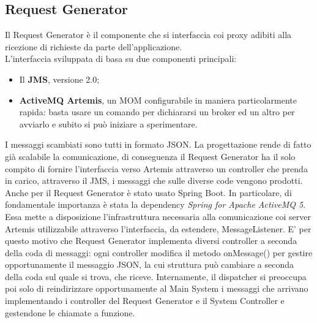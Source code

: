 \subsection{Request Generator}
Il Request Generator è il componente che si interfaccia coi proxy adibiti alla ricezione di richieste da parte dell'applicazione. 
\\L'interfaccia sviluppata di basa su due componenti principali: 
\begin{itemize}
	\item Il \textbf{JMS}, versione 2.0;
	\item \textbf{ActiveMQ Artemis}, un MOM configurabile in maniera particolarmente rapida: basta usare un comando per dichiararsi un broker ed un altro per avviarlo e subito si può iniziare a sperimentare.
\end{itemize}
I messaggi scambiati sono tutti in formato JSON. La progettazione rende di fatto già scalabile la comunicazione, di conseguenza il Request Generator ha il solo compito di fornire l'interfaccia verso Artemis attraverso un controller che prenda in carico, attraverso il JMS, i messaggi che sulle diverse code vengono prodotti. \vspace{0.5cm}
\\Anche per il Request Generator è stato usato Spring Boot. In particolare, di fondamentale importanza è stata la dependency \textit{Spring for Apache ActiveMQ 5}. Essa mette a disposizione l'infrastruttura necessaria alla comunicazione coi server Artemis utilizzabile attraverso l'interfaccia, da estendere, MessageListener. E' per questo motivo che Request Generator implementa diversi controller a seconda della coda di messaggi: ogni controller modifica il metodo onMessage() per gestire opportunamente il messaggio JSON, la cui struttura può cambiare a seconda della coda sul quale si trova, che riceve. Internamente, il dispatcher si preoccupa poi solo di reindirizzare opportunamente al Main System i messaggi che arrivano implementando i controller del Request Generator e il System Controller e gestendone le chiamate a funzione.  

